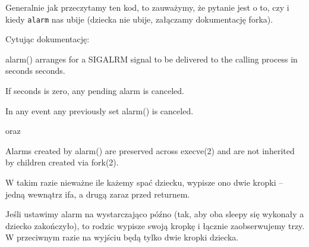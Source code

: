 Generalnie jak przeczytamy ten kod, to zauważymy, że pytanie jest o to, czy i kiedy \texttt{alarm} nas ubije (dziecka nie ubije, załączamy dokumentację forka).

Cytując dokumentację:
\begin{displayquote}
	alarm() arranges for a SIGALRM signal to be delivered to the
	calling process in seconds seconds.

	If seconds is zero, any pending alarm is canceled.

	In any event any previously set alarm() is canceled.
\end{displayquote}
oraz
\begin{displayquote}
	Alarms created by alarm() are preserved across execve(2) and are not inherited by children created via fork(2).
\end{displayquote}

W takim razie nieważne ile każemy spać dziecku, wypisze ono dwie kropki -- jedną wewnątrz ifa, a drugą zaraz przed returnem.

Jeśli ustawimy alarm na wystarczająco późno (tak, aby oba sleepy się wykonały a dziecko zakończyło), to rodzic wypisze swoją kropkę i łącznie zaobserwujemy trzy. W przeciwnym razie na wyjściu będą tylko dwie kropki dziecka.